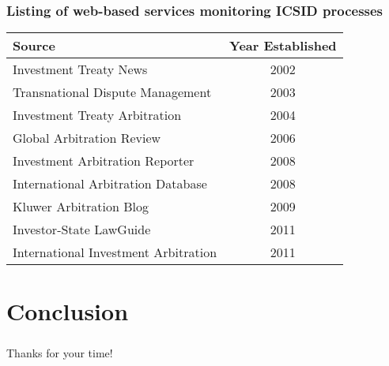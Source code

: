 \documentclass[10pt]{beamer}
\begin{document}
\begin{frame}
\frametitle{Listing of web-based services monitoring ICSID processes}

\begin{table}[ht]
\centering
\begin{tabular}{lc}
	\hline\hline
	Source & Year Established \\
	\hline
	Investment Treaty News & 2002 \\
	Transnational Dispute Management & 2003 \\
	Investment Treaty Arbitration & 2004 \\
	Global Arbitration Review & 2006 \\
	Investment Arbitration Reporter & 2008 \\
	International Arbitration Database & 2008 \\
	Kluwer Arbitration Blog & 2009 \\
	Investor-State LawGuide & 2011 \\
	International Investment Arbitration & 2011 \\
	\hline\hline
\end{tabular}
\end{table}

\end{frame}

\section{Conclusion}

\begin{frame}
\frametitle{}

\begin{center}
Thanks for your time!
\end{center}

\end{frame}
\end{document}

